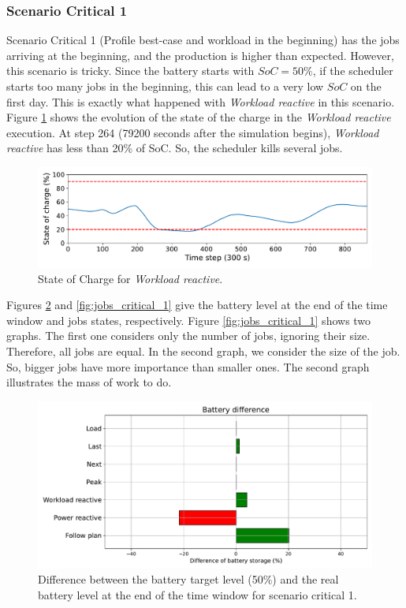 \subsubsection{Scenario Critical 1}
Scenario Critical 1 (Profile best-case and workload in the beginning) has the jobs arriving at the beginning, and the production is higher than expected. However, this scenario is tricky. Since the battery starts with $SoC = 50\%$, if the scheduler starts too many jobs in the beginning, this can lead to a very low $SoC$ on the first day. This is exactly what happened with \emph{Workload reactive} in this scenario. Figure \ref{fig:DPM_soc} shows the evolution of the state of the charge in the \emph{Workload reactive} execution. At step 264 (79200 seconds after the simulation begins), \emph{Workload reactive} has less than 20\% of SoC. So, the scheduler kills several jobs. 

\begin{figure}[!htb]
    \centering
    \includegraphics[scale=0.55]{Images/Compensations/critical_soc_s1.pdf}
    \caption{State of Charge for \emph{Workload reactive}.}
    \label{fig:DPM_soc}
\end{figure}

Figures \ref{fig:SoC_critical_1} and \ref{fig:jobs_critical_1} give the battery level at the end of the time window and jobs states, respectively. Figure \ref{fig:jobs_critical_1} shows two graphs. The first one considers only the number of jobs, ignoring their size. Therefore, all jobs are equal. In the second graph, we consider the size of the job. So, bigger jobs have more importance than smaller ones. The second graph illustrates the mass of work to do.

\begin{figure}[!htb]
    \centering
    \includegraphics[scale=0.55]{Images/Compensations/battery_critical_1.pdf}
    \caption{Difference between the battery target level (50\%) and the real battery level at the end of the time window for scenario critical 1.}
    \label{fig:SoC_critical_1}
\end{figure}

